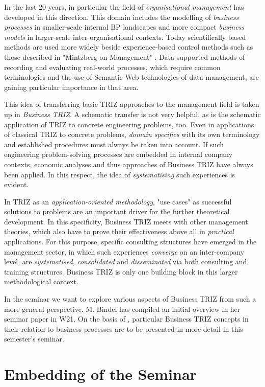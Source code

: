 \documentclass[11pt,a4paper]{article}
\begin{document}
In the last 20 years, in particular the field of \emph{organisational
  management} has developed in this direction.  This domain includes the
modelling of \emph{business processes} in smaller-scale internal BP landscapes
and more compact \emph{business models} in larger-scale inter-organisational
contexts.  Today scientifically based methods are used more widely beside
experience-based control methods such as those described in "Mintzberg on
Management" \cite{Mintzberg}. Data-supported methods of recording and
evaluating real-world processes, which require common terminologies and the
use of Semantic Web technologies of data management, are gaining particular
importance in that area.

This idea of transferring basic TRIZ approaches to the management field is
taken up in \emph{Business TRIZ}. A schematic transfer is not very helpful, as
is the schematic application of TRIZ to concrete engineering problems, too.
Even in applications of classical TRIZ to concrete problems, \emph{domain
  specifics} with its own terminology and established procedures must always
be taken into account. If such engineering problem-solving processes are
embedded in internal company contexts, economic analyses and thus approaches
of Business TRIZ have always been applied. In this respect, the idea of
\emph{systematising} such experiences is evident.

In TRIZ as an \emph{application-oriented methodology}, "use cases" as
successful solutions to problems are an important driver for the further
theoretical development. In this specificity, Business TRIZ meets with other
management theories, which also have to prove their effectiveness above all in
\emph{practical} applications. For this purpose, specific consulting
structures have emerged in the management sector, in which such experiences
\emph{converge} on an inter-company level, are \emph{systematised},
\emph{consolidated} and \emph{disseminated} via both consulting and training
structures. Business TRIZ is only one building block in this larger
methodological context.

In the seminar we want to explore various aspects of Business TRIZ from such a
more general perspective. M. Bindel \cite{Bindel} has compiled an initial
overview in her seminar paper in W21. On the basis of \cite{HSI}, particular
Business TRIZ concepts in their relation to business processes are to be
presented in more detail in this semester's seminar.

\section{Embedding of the Seminar}
\end{document}
